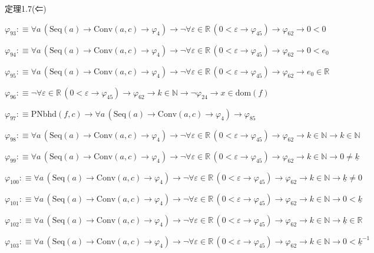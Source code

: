 \begin{fullproof}{定理1.7(⇐)}
\begin{abbrevlist}
\item $\varphi_{93} :\equiv \forall a\,(\mathrm{Seq}(a) \to \mathrm{Conv}(a,c) \to \varphi_{4}) \to \neg \forall \varepsilon \in \mathbb{R}\,(0 < \varepsilon \to \varphi_{45}) \to \varphi_{62} \to 0 < 0$
\item $\varphi_{94} :\equiv \forall a\,(\mathrm{Seq}(a) \to \mathrm{Conv}(a,c) \to \varphi_{4}) \to \neg \forall \varepsilon \in \mathbb{R}\,(0 < \varepsilon \to \varphi_{45}) \to \varphi_{62} \to 0 < e_{0}$
\item $\varphi_{95} :\equiv \forall a\,(\mathrm{Seq}(a) \to \mathrm{Conv}(a,c) \to \varphi_{4}) \to \neg \forall \varepsilon \in \mathbb{R}\,(0 < \varepsilon \to \varphi_{45}) \to \varphi_{62} \to e_{0} \in \mathbb{R}$
\item $\varphi_{96} :\equiv \neg \forall \varepsilon \in \mathbb{R}\,(0 < \varepsilon \to \varphi_{45}) \to \varphi_{62} \to k \in \mathbb{N} \to \neg \varphi_{24} \to x \in \mathrm{dom}(f)$
\item $\varphi_{97} :\equiv \mathrm{PNbhd}(f,c) \to \forall a\,(\mathrm{Seq}(a) \to \mathrm{Conv}(a,c) \to \varphi_{4}) \to \varphi_{85}$
\item $\varphi_{98} :\equiv \forall a\,(\mathrm{Seq}(a) \to \mathrm{Conv}(a,c) \to \varphi_{4}) \to \neg \forall \varepsilon \in \mathbb{R}\,(0 < \varepsilon \to \varphi_{45}) \to \varphi_{62} \to k \in \mathbb{N} \to k \in \mathbb{N}$
\item $\varphi_{99} :\equiv \forall a\,(\mathrm{Seq}(a) \to \mathrm{Conv}(a,c) \to \varphi_{4}) \to \neg \forall \varepsilon \in \mathbb{R}\,(0 < \varepsilon \to \varphi_{45}) \to \varphi_{62} \to k \in \mathbb{N} \to 0 \neq \underline{k}$
\item $\varphi_{100} :\equiv \forall a\,(\mathrm{Seq}(a) \to \mathrm{Conv}(a,c) \to \varphi_{4}) \to \neg \forall \varepsilon \in \mathbb{R}\,(0 < \varepsilon \to \varphi_{45}) \to \varphi_{62} \to k \in \mathbb{N} \to \underline{k} \neq 0$
\item $\varphi_{101} :\equiv \forall a\,(\mathrm{Seq}(a) \to \mathrm{Conv}(a,c) \to \varphi_{4}) \to \neg \forall \varepsilon \in \mathbb{R}\,(0 < \varepsilon \to \varphi_{45}) \to \varphi_{62} \to k \in \mathbb{N} \to 0 < \underline{k}$
\item $\varphi_{102} :\equiv \forall a\,(\mathrm{Seq}(a) \to \mathrm{Conv}(a,c) \to \varphi_{4}) \to \neg \forall \varepsilon \in \mathbb{R}\,(0 < \varepsilon \to \varphi_{45}) \to \varphi_{62} \to k \in \mathbb{N} \to \underline{k} \in \mathbb{R}$
\item $\varphi_{103} :\equiv \forall a\,(\mathrm{Seq}(a) \to \mathrm{Conv}(a,c) \to \varphi_{4}) \to \neg \forall \varepsilon \in \mathbb{R}\,(0 < \varepsilon \to \varphi_{45}) \to \varphi_{62} \to k \in \mathbb{N} \to 0 < \underline{k}^{-1}$

\end{abbrevlist}
\end{fullproof}
